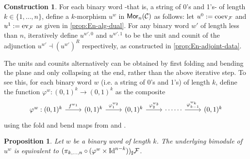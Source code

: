 \documentclass[10pt, reqno, twoside
, final
]{amsart}
\numberwithin{equation}{subsection}%
\theoremstyle{definition}
\theoremstyle{definition}
\theoremstyle{definition}
\theoremstyle{definition}
\newtheorem{cons}[defn]{Construction}
\theoremstyle{definition}
\theoremstyle{definition}
\theoremstyle{definition}
\theoremstyle{definition}
\theoremstyle{definition}
\theoremstyle{plain}
\theoremstyle{definition}
\theoremstyle{plain}
\theoremstyle{definition}
\theoremstyle{plain}
\theoremstyle{definition}
\theoremstyle{definition}
\theoremstyle{plain}
\theoremstyle{plain}
\theoremstyle{definition}
\theoremstyle{plain}
\theoremstyle{plain}
\newtheorem{prop}[defn]{Proposition}
\theoremstyle{plain}
\begin{document}
\begin{cons}\label{cons:right-adj-data}
For each binary word -that is, a string of 0's and 1's- of length $k \in \{1,...,n\}$, define a $k$-morphism $u^w$ in $\mathsf{Mor}_n(\mathcal{C})$ as follows: let $u^0 := \mathrm{coev}_{\mathcal{F}}$ and $u^1:= \mathrm{ev}_{\mathcal{F}}$ as given in \cref{prop:En-alg-dual}. For any binary word $w'$ of length less than $n$, iteratively define $u^{w',0}$ and $u^{w',1}$ to be the unit and counit of the adjunction $u^{w'} \dashv (u^{w'})^R$ respectively, as constructed in \cref{prop:En-adjoint-data}.
\end{cons}


The units and counits alternatively can be obtained by first folding and bending the plane and only collapsing at the end, rather than the above iterative step. To see this,  for each binary word $w$ (i.e. a string of 0's and 1's) of length $k$, define the function $\varphi^{w}:(0,1)^k \to (0,1)^k$ as the composite
\begin{equation*}
\begin{tikzcd}
    \varphi^w: (0,1)^k \arrow[r,"f^{w_1}"] & (0,1)^k \arrow[r,"\varphi^{w_2}_{1}"] & (0,1)^k \arrow[r,"\varphi^{w_3}_{2}"] &  \cdots \cdots \arrow[r,"\varphi^{w_k}_{k-1}"] & (0,1)^k 
\end{tikzcd}
\end{equation*}
using the fold and bend maps from  and .


\begin{prop}\label{prop:equiv-of-bimods}
Let $w$ be a binary word of length $k$. The underlying bimodule of $u^w$ is equivalent to $ (\pi_{k,...,n} \circ (\varphi^w \times \text{Id}^{n-k}))_\sharp \mathcal{F} $.
\end{prop}
\end{document}
